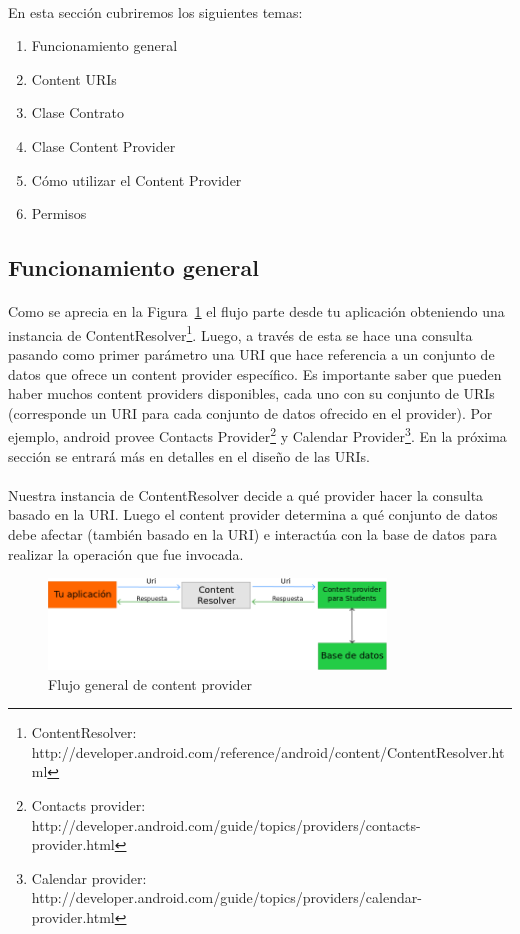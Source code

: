 \documentclass[10pt]{extarticle}
\begin{document}
\paragraph{}
En esta sección cubriremos los siguientes temas:
\begin{enumerate}
	\item Funcionamiento general
	\item Content URIs
	\item Clase Contrato
	\item Clase Content Provider
	\item Cómo utilizar el Content Provider
	\item Permisos
\end{enumerate}

\subsection{Funcionamiento general}

\paragraph{}
Como se aprecia en la Figura~\ref{fig:flujo_content_provider} el flujo parte desde tu aplicación obteniendo una instancia de ContentResolver\footnote{ContentResolver: http://developer.android.com/reference/android/content/ContentResolver.html}. Luego, a través de esta se hace una consulta pasando como primer parámetro una URI que hace referencia a un conjunto de datos que ofrece un content provider específico. Es importante saber que pueden haber muchos content providers disponibles, cada uno con su conjunto de URIs (corresponde un URI para cada conjunto de datos ofrecido en el provider). Por ejemplo, android provee Contacts Provider\footnote{Contacts provider: http://developer.android.com/guide/topics/providers/contacts-provider.html} y Calendar Provider\footnote{Calendar provider: http://developer.android.com/guide/topics/providers/calendar-provider.html}. En la próxima sección se entrará más en detalles en el diseño de las URIs.

\paragraph{}
Nuestra instancia de ContentResolver decide a qué provider hacer la consulta basado en la URI. Luego el content provider determina a qué conjunto de datos debe afectar (también basado en la URI) e interactúa con la base de datos para realizar la operación que fue invocada.
\begin{figure}[H]
    \centering
    \includegraphics[width=0.8\textwidth]{ContentProviderGeneral.png}
    \caption{Flujo general de content provider}
    \label{fig:flujo_content_provider}
\end{figure}
\end{document}
